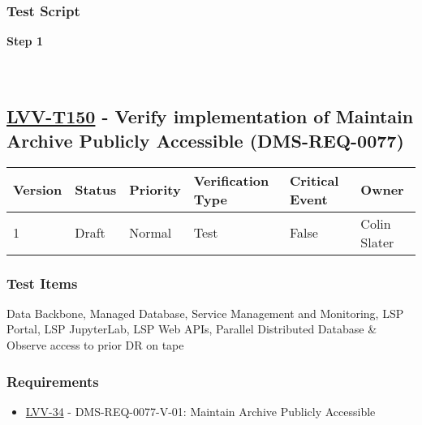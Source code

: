 \hypertarget{test-script-126}{%
\subsubsection{Test Script}\label{test-script-126}}

\textbf{Step 1}\\
~\\
~\\

\hypertarget{lvv-t150---verify-implementation-of-maintain-archive-publicly-accessible-dms-req-0077}{%
\subsection{\texorpdfstring{\href{https://jira.lsstcorp.org/secure/Tests.jspa\#/testCase/LVV-T150}{LVV-T150}
- Verify implementation of Maintain Archive Publicly Accessible
(DMS-REQ-0077)}{LVV-T150 - Verify implementation of Maintain Archive Publicly Accessible (DMS-REQ-0077)}}\label{lvv-t150---verify-implementation-of-maintain-archive-publicly-accessible-dms-req-0077}}

\begin{longtable}[]{@{}llllll@{}}
\toprule
Version & Status & Priority & Verification Type & Critical Event &
Owner\tabularnewline
\midrule
\endhead
1 & Draft & Normal & Test & False & Colin Slater\tabularnewline
\bottomrule
\end{longtable}

\hypertarget{test-items-126}{%
\subsubsection{Test Items}\label{test-items-126}}

Data Backbone, Managed Database, Service Management and Monitoring, LSP
Portal, LSP JupyterLab, LSP Web APIs, Parallel Distributed Database \&
Observe access to prior DR on tape

\hypertarget{requirements-127}{%
\subsubsection{Requirements}\label{requirements-127}}

\begin{itemize}
\tightlist
\item
  \href{https://jira.lsstcorp.org/browse/LVV-34}{LVV-34} -
  DMS-REQ-0077-V-01: Maintain Archive Publicly Accessible
\end{itemize}

